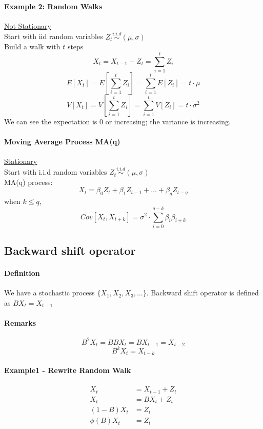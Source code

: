\documentclass[11pt]{article}
\newcommand{\under}[1]{\underline{#1}}
\begin{document}
\paragraph{Example 2: Random Walks}
\under{Not Stationary} \\
Start with iid random variables $Z_t \overset{i.i.d}{\sim} (\mu, \sigma)$\\
Build a walk with $t$ steps
$$X_t = X_{t-1} + Z_t = \sum_{i=1} ^ t Z_i$$
$$E[X_t] = E[\sum_{i=1}^t Z_i] = \sum_{i=1}^t E[Z_i] = t\cdot \mu$$
$$V[X_t] = V[\sum_{i=1}^t Z_i] = \sum_{i=1}^t V[Z_i] = t\cdot \sigma^2$$
We can see the expectation is 0 or increasing; the variance is increasing.

\paragraph{Moving Average Process MA(q)}
\under{Stationary}\\
Start with i.i.d random variables $Z_t \overset{i.i.d}{\sim} (\mu, \sigma)$ \\
MA(q) process: 
$$X_t = \beta_0 Z_t + \beta_1 Z_{t-1} + \hdots + \beta_q Z_{t-q}$$
when $k \leq q$, 
$$Cov[X_t, X_{t+k}] = \sigma^2 \cdot \sum_{i=0}^{q-k} \beta_i\beta_{i+k}$$

\subsection{Backward shift operator}
\paragraph{Definition}
We have a stochastic process $\{X_1, X_2, X_3, \hdots\}$. Backward shift operator is defined as 
$BX_t = X_{t-1}$
\paragraph{Remarks}
$$B^2 X_t = BBX_t = BX_{t-1} = X_{t-2}$$
$$B^kX_t = X_{t-k}$$
\paragraph{Example1 - Rewrite Random Walk}
\begin{align*}
X_t &= X_{t-1} + Z_t \\
X_t &= BX_t + Z_t \\
(1 - B) X_t &= Z_t \\
\phi(B) X_t &= Z_t  \tag{$\phi(B) = 1 - B$}
\end{align*}
\end{document}
